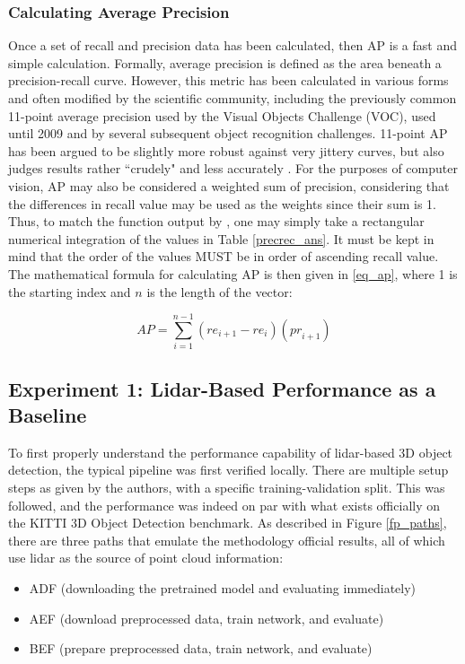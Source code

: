 \subsubsection{Calculating Average Precision}
Once a set of recall and precision data has been calculated, then AP is a fast and simple calculation. Formally, average precision is defined as the area beneath a precision-recall curve. However, this metric has been calculated in various forms and often modified by the scientific community, including the previously common 11-point average precision used by the Visual Objects Challenge (VOC), used until 2009 and by several subsequent object recognition challenges. 11-point AP has been argued to be slightly more robust against very jittery curves, but also judges results rather ``crudely" and less accurately \cite{everingham_pascal_2015}. For the purposes of computer vision, AP may also be considered a weighted sum of precision, considering that the differences in recall value may be used as the weights since their sum is 1. Thus, to match the function output by \cite{pedregosa_scikit-learn:_2011}, one may simply take a rectangular numerical integration of the values in Table \ref{precrec_ans}. It must be kept in mind that the order of the values MUST be in order of ascending recall value. The mathematical formula for calculating AP is then given in \ref{eq_ap}, where 1 is the starting index and $n$ is the length of the vector:

\begin{equation}
AP = \sum^{n-1}_{i=1} ({re}_{i+1}-{re}_{i})({pr}_{i+1})
\label{eq_ap}
\end{equation}

\subsection{Experiment 1: Lidar-Based Performance as a Baseline}

To first properly understand the performance capability of lidar-based 3D object detection, the typical pipeline was first verified locally. There are multiple setup steps as given by the authors, with a specific training-validation split. This was followed, and the performance was indeed on par with what exists officially on the KITTI 3D Object Detection benchmark. As described in Figure \ref{fp_paths}, there are three paths that emulate the methodology official results, all of which use lidar as the source of point cloud information: 

\begin{itemize} \itemsep=-0.5em
	\item ADF (downloading the pretrained model and evaluating immediately)
	\item AEF (download preprocessed data, train network, and evaluate)
	\item BEF (prepare preprocessed data, train network, and evaluate)
\end{itemize}

